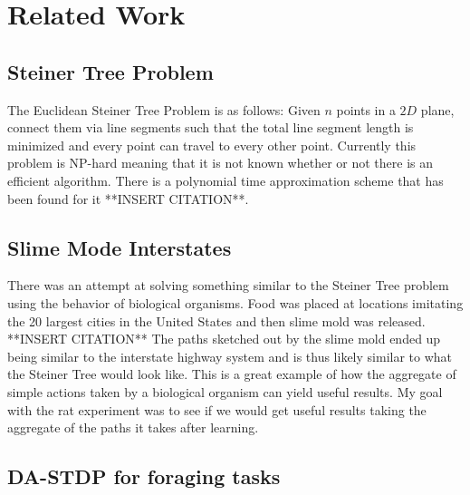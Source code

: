 \documentclass[conference]{IEEEtran}
\begin{document}
\section{Related Work}

\subsection{Steiner Tree Problem}

The Euclidean Steiner Tree Problem is as follows: Given $n$ points in a $2D$ plane, connect them via line segments such that the total line segment length is minimized and every point can travel to every other point. Currently this problem is NP-hard meaning that it is not known whether or not there is an efficient algorithm. There is a polynomial time approximation scheme that has been found for it **INSERT CITATION**.  

\subsection{Slime Mode Interstates}

There was an attempt at solving something similar to the Steiner Tree problem using the behavior of biological organisms. Food was placed at locations imitating the 20 largest cities in the United States and then slime mold was released. **INSERT CITATION** The paths sketched out by the slime mold ended up being similar to the interstate highway system and is thus likely similar to what the Steiner Tree would look like. This is a great example of how the aggregate of simple actions taken by a biological organism can yield useful results. My goal with the rat experiment was to see if we would get useful results taking the aggregate of the paths it takes after learning. 

\subsection{DA-STDP for foraging tasks}
\end{document}
